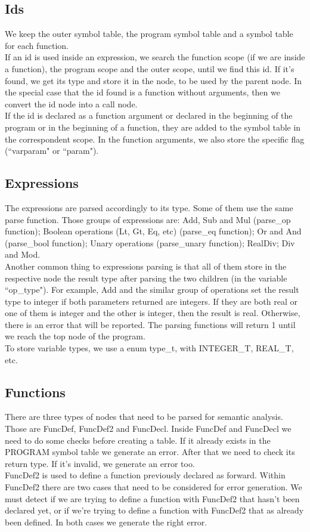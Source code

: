 \documentclass[12pt]{article}
\begin{document}
\subsection{Ids}

We keep the outer symbol table, the program symbol table and a symbol table for each function. \\
If an id is used inside an expression, we search the function scope (if we are inside a function), the program scope and the outer scope, until we find this id. If it's found, we get its type and store it in the node, to be used by the parent node. In the special case that the id found is a function without arguments, then we convert the id node into a call node. \\
If the id is declared as a function argument or declared in the beginning of the program or in the beginning of a function, they are added to the symbol table in the correspondent scope. In the function arguments, we also store the specific flag (``varparam" or ``param").

\subsection{Expressions}

The expressions are parsed accordingly to its type. Some of them use the same parse function. Those groups of expressions are: Add, Sub and Mul (parse\_op function); Boolean operations (Lt, Gt, Eq, etc) (parse\_eq function); Or and And (parse\_bool function); Unary operations (parse\_unary function); RealDiv; Div and Mod.\\
Another common thing to expressions parsing is that all of them store in the respective node the result type after parsing the two children (in the variable ``op\_type"). For example, Add and the similar group of operations set the result type to integer if both parameters returned are integers. If they are both real or one of them is integer and the other is integer, then the result is real. Otherwise, there is an error that will be reported. The parsing functions will return 1 until we reach the top node of the program.\\
To store variable types, we use a enum type\_t, with INTEGER\_T, REAL\_T, etc.

\subsection{Functions}
There are three types of nodes that need to be parsed for semantic analysis. Those are FuncDef, FuncDef2 and FuncDecl. Inside FuncDef and FuncDecl we need to do some checks before creating a table. If it already exists in the PROGRAM symbol table we generate an error. After that we need to check its return type. If it's invalid, we generate an error too. \\
FuncDef2 is used to define a function previously declared as forward. Within FuncDef2 there are two cases that need to be considered for error generation. We must detect if we are trying to define a function with FuncDef2 that hasn't been declared yet, or if we're trying to define a function with FuncDef2 that as already been defined. In both cases we generate the right error. 
\end{document}
